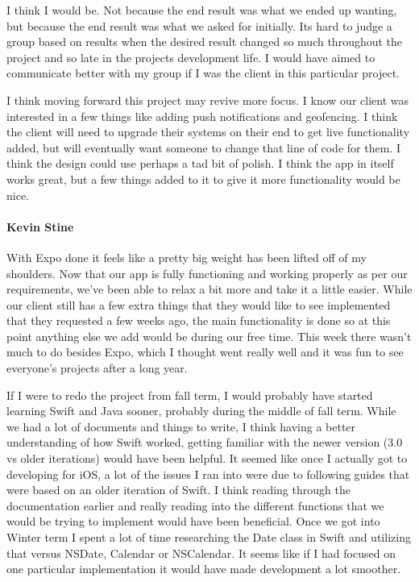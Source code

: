 I think I would be. Not because the end result was what we ended up wanting, but because the end result was what we asked for initially. Its hard to judge a group based on results when the desired result changed so much throughout the project and so late in the projects development life. I would have aimed to communicate better with my group if I was the client in this particular project.

I think moving forward this project may revive more focus. I know our client was interested in a few things like adding push notifications and geofencing. I think the client will need to upgrade their systems on their end to get live functionality added, but will eventually want someone to change that line of code for them. I think the design could use perhaps a tad bit of polish. I think the app in itself works great, but a few things added to it to give it more functionality would be nice.

			\paragraph{Kevin Stine}
			With Expo done it feels like a pretty big weight has been lifted off of my shoulders. Now that our app is fully functioning and working properly as per our requirements, we've been able to relax a bit more and take it a little easier. While our client still has a few extra things that they would like to see implemented that they requested a few weeks ago, the main functionality is done so at this point anything else we add would be during our free time. This week there wasn't much to do besides Expo, which I thought went really well and it was fun to see everyone's projects after a long year.

			If I were to redo the project from fall term, I would probably have started learning Swift and Java sooner, probably during the middle of fall term. While we had a lot of documents and things to write, I think having a better understanding of how Swift worked, getting familiar with the newer version (3.0 vs older iterations) would have been helpful. It seemed like once I actually got to developing for iOS, a lot of the issues I ran into were due to following guides that were based on an older iteration of Swift. I think reading through the documentation earlier and really reading into the different functions that we would be trying to implement would have been beneficial. Once we got into Winter term I spent a lot of time researching the Date class in Swift and utilizing that versus NSDate, Calendar or NSCalendar. It seems like if I had focused on one particular implementation it would have made development a lot smoother.

